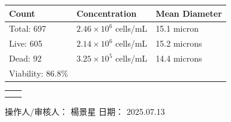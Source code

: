 \documentclass[UTF8,10pt,a4paper,fontset=fandol]{ctexart}
\newcommand{\fieldvalue}[1]{#1}
\newcommand{\handwritten}[1]{#1}
\begin{document}
\medskip
\noindent
\begin{tabularx}{\textwidth}{@{}X X X@{}}
\textbf{Count} & \textbf{Concentration} & \textbf{Mean Diameter} \\[2pt]
\hline
Total:
\fieldvalue{697}
&
\fieldvalue{$2.46\times 10^6$ cells/mL}
&
\fieldvalue{15.1 micron}
\\[3pt]

Live:
\fieldvalue{605}
&
\fieldvalue{$2.14\times 10^6$ cells/mL}
&
\fieldvalue{15.2 microns}
\\[3pt]

Dead:
\fieldvalue{92}
&
\fieldvalue{$3.25\times 10^5$ cells/mL}
&
\fieldvalue{14.4 microns}
\\[3pt]

Viability:
\fieldvalue{86.8\%}
&
&
\end{tabularx}

\medskip

\noindent
\begin{tabular}{cc}
\fbox{\rule{0pt}{4.0cm}\rule{0.43\textwidth}{0pt}}
&
\fbox{\rule{0pt}{4.0cm}\rule{0.43\textwidth}{0pt}}
\\[8pt]
\fbox{\rule{0pt}{4.0cm}\rule{0.43\textwidth}{0pt}}
&
\fbox{\rule{0pt}{4.0cm}\rule{0.43\textwidth}{0pt}}
\end{tabular}

\vfill

\noindent
操作人/审核人：
\fieldvalue{\handwritten{楊景星}}
\hfill
日期：
\fieldvalue{\handwritten{2025.07.13}}
\end{document}
